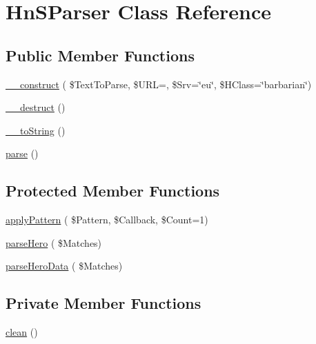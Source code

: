 \hypertarget{class_hn_s_parser}{}\section{Hn\+S\+Parser Class Reference}
\label{class_hn_s_parser}
\subsection*{Public Member Functions}
\begin{DoxyCompactItemize}
\item 
\hyperlink{class_hn_s_parser_a609c801ee8a446c2de537155579f0c9b}{\+\_\+\+\_\+construct} ( \$Text\+To\+Parse, \$U\+RL=\textquotesingle{}\textquotesingle{}, \$Srv=\char`\"{}eu\char`\"{}, \$H\+Class=\char`\"{}barbarian\char`\"{})
\item 
\hyperlink{class_hn_s_parser_adb3bc07366e819fb18ff9edd702fb954}{\+\_\+\+\_\+destruct} ()
\item 
\hyperlink{class_hn_s_parser_a54c9843058539b99d6695a3136184150}{\+\_\+\+\_\+to\+String} ()
\item 
\hyperlink{class_hn_s_parser_a472740b8d6c5cc96019b67fe6304d828}{parse} ()
\end{DoxyCompactItemize}
\subsection*{Protected Member Functions}
\begin{DoxyCompactItemize}
\item 
\hyperlink{class_hn_s_parser_af1819b45d1b6e1351bf027579db4a1e5}{apply\+Pattern} ( \$Pattern, \$Callback, \$Count=1)
\item 
\hyperlink{class_hn_s_parser_ac5bb3acdf1dffb3e1ecd67de9e0e5b06}{parse\+Hero} ( \$Matches)
\item 
\hyperlink{class_hn_s_parser_a8090ef63c59e0802986e4ef011994575}{parse\+Hero\+Data} ( \$Matches)
\end{DoxyCompactItemize}
\subsection*{Private Member Functions}
\begin{DoxyCompactItemize}
\item 
\hyperlink{class_hn_s_parser_a09477de7b8332274e60f5d62d1053f3f}{clean} ()
\end{DoxyCompactItemize}
